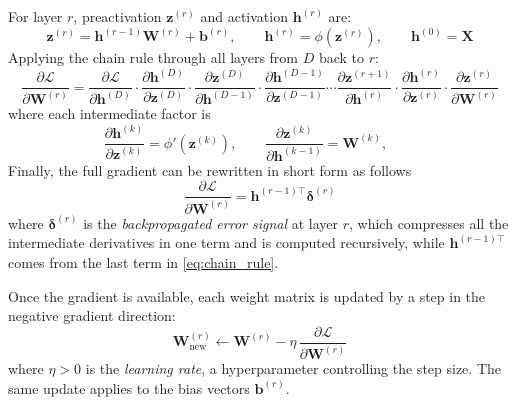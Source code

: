 For layer $r$, preactivation $\mathbf{z}^{(r)}$ and activation $\mathbf{h}^{(r)}$ are:
\begin{equation}
    \mathbf{z}^{(r)} = \mathbf{h}^{(r-1)} \mathbf{W}^{(r)} + \mathbf{b}^{(r)}, \qquad \mathbf{h}^{(r)} = \phi\!\left(\mathbf{z}^{(r)}\right), \qquad \mathbf{h}^{(0)} = \mathbf{X}
\end{equation}
Applying the chain rule through all layers from $D$ back to $r$:
\begin{equation}
    \frac{\partial \mathcal{L}}{\partial \mathbf{W}^{(r)}} =
    \frac{\partial \mathcal{L}}{\partial \mathbf{h}^{(D)}} \cdot
    \frac{\partial \mathbf{h}^{(D)}}{\partial \mathbf{z}^{(D)}} \cdot
    \frac{\partial \mathbf{z}^{(D)}}{\partial \mathbf{h}^{(D-1)}} \cdot
    \frac{\partial \mathbf{h}^{(D-1)}}{\partial \mathbf{z}^{(D-1)}} \cdots
    \frac{\partial \mathbf{z}^{(r+1)}}{\partial \mathbf{h}^{(r)}} \cdot
    \frac{\partial \mathbf{h}^{(r)}}{\partial \mathbf{z}^{(r)}} \cdot
    \frac{\partial \mathbf{z}^{(r)}}{\partial \mathbf{W}^{(r)}}
      \label{eq:chain_rule}
\end{equation}
where each intermediate factor is
\begin{equation}
    \frac{\partial \mathbf{h}^{(k)}}{\partial \mathbf{z}^{(k)}} = \phi'\!\left(\mathbf{z}^{(k)}\right), \qquad
    \frac{\partial \mathbf{z}^{(k)}}{\partial \mathbf{h}^{(k-1)}} = \mathbf{W}^{(k)}, \qquad
\end{equation}
Finally, the full gradient can be rewritten in short form as follows
\begin{equation}
    \frac{\partial \mathcal{L}}{\partial \mathbf{W}^{(r)}} = \mathbf{h}^{(r-1)\top} \boldsymbol{\delta}^{(r)}
\end{equation}
where $\boldsymbol{\delta}^{(r)}$ is the \textit{backpropagated error signal} at layer $r$, which compresses all the intermediate derivatives in one term and is computed recursively, while $\mathbf{h}^{(r-1)\top}$ comes from the last term in \eqref{eq:chain_rule}.

Once the gradient is available, each weight matrix is updated by a step in the negative gradient direction:
\begin{equation}
    \mathbf{W}^{(r)}_{\text{new}} \leftarrow \mathbf{W}^{(r)} - \eta \, \frac{\partial \mathcal{L}}{\partial \mathbf{W}^{(r)}}
    \label{eq:gd_update}
\end{equation}
where $\eta > 0$ is the \textit{learning rate}, a hyperparameter controlling the step size. The same update applies to the bias vectors $\mathbf{b}^{(r)}$.

